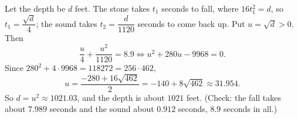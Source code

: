 Let the depth be $d$ feet. The stone takes $t_1$ seconds to fall, where $16t_1^2=d$, so $t_1=\dfrac{\sqrt d}{4}$; the sound takes $t_2=\dfrac{d}{1120}$ seconds to come back up. Put $u=\sqrt d>0$. Then
\[\dfrac {u}{4}+\dfrac{u^2}{1120}=8.9\iff u^2+280u-9968=0 .\]
Since $280^2+4\cdot9968=118272=256\cdot462$,
\[u=\dfrac{-280+16\sqrt{462}}{2}=-140+8\sqrt{462}\approx31.954 .\]
So $d=u^2\approx1021.03$, and the depth is about $\boxed{1021}$ feet. (Check: the fall takes about $7.989$ seconds and the sound about $0.912$ seconds, $8.9$ seconds in all.)
